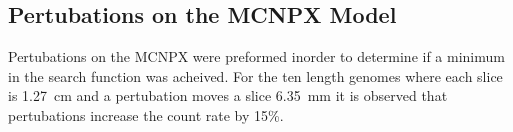 \subsection{Pertubations on the MCNPX Model}
Pertubations on the MCNPX were preformed inorder to determine if a minimum in the search function was acheived.
For the ten length genomes where each slice is \SI{1.27}{\cm} and a pertubation moves a slice \SI{6.35}{\mm} it is observed that pertubations increase the count rate by 15\%.

